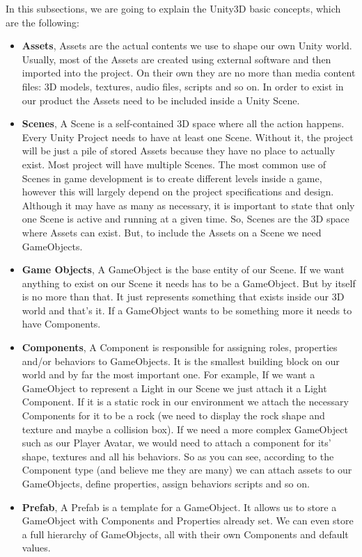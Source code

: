 In this subsections, we are going to explain the Unity3D basic concepts, which are the following:

\begin{itemize}
\item \textbf{Assets}, Assets are the actual contents we use to shape our own Unity world. Usually, most of the Assets are created using external software and then imported into the project.
On their own they are no more than media content files: 3D models, textures, audio files, scripts and so on. 
In order to exist in our product the Assets need to be included inside a Unity Scene.
\item \textbf{Scenes}, A Scene is a self-contained 3D space where all the action happens. Every Unity Project needs to have at least one Scene. Without it, the project will be just a pile of stored Assets because they have no place to actually exist.
Most project will have multiple Scenes. The most common use of Scenes in game development is to create different levels inside a game, however this will largely depend on the project specifications and design. Although it may have as many as necessary, it is important to state that only one Scene is active and running at a given time.
So, Scenes are the 3D space where Assets can exist. But, to include the Assets on a Scene we need GameObjects.
\item \textbf{Game Objects}, A GameObject is the base entity of our Scene. If we want anything to exist on our Scene it needs has to be a GameObject. But by itself is no more than that. It just represents something that exists inside our 3D world and that’s it.
If a GameObject wants to be something more it needs to have Components.
\item \textbf{Components}, A Component is responsible for assigning roles, properties and/or behaviors to GameObjects. It is the smallest building block on our world and by far the most important one.
For example, If we want a GameObject to represent a Light in our Scene we just attach it a Light Component. If it is a static rock in our environment we attach the necessary Components for it to be a rock (we need to display the rock shape and texture and maybe a collision box). If we need a more complex GameObject such as our Player Avatar, we would need to attach a component for its’ shape, textures and all his behaviors.
So as you can see, according to the Component type (and believe me they are many) we can attach assets to our GameObjects, define properties, assign behaviors scripts and so on.
\item \textbf{Prefab}, A Prefab is a template for a GameObject. It allows us to store a GameObject with Components and Properties already set. We can even store a full hierarchy of GameObjects, all with their own Components and default values. 
\end{itemize}

